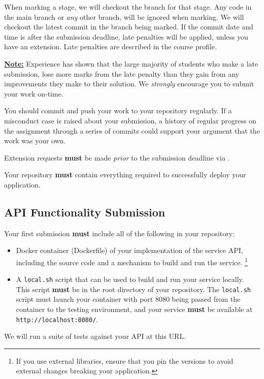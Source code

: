 \documentclass{csse4400}
\begin{document}
When marking a stage, we will checkout the branch for that stage.
Any code in the main branch or \textit{any} other branch, will be ignored when marking.
We will checkout the latest commit in the branch being marked.
If the commit date and time is after the submission deadline, late penalties will be applied,
unless you have an extension.
Late penalties are described in the course profile.

\textbf{\underline{Note:}} Experience has shown that the large majority of students who make a late submission,
lose more marks from the late penalty than they gain from any improvements they make to their solution.
We \textit{strongly} encourage you to submit your work on-time.

You should commit and push your work to your repository regularly.
If a misconduct case is raised about your submission,
a history of regular progress on the assignment through a series of commits
could support your argument that the work was your own.

Extension requests \textbf{must} be made \emph{prior} to the submission deadline via .

Your repository \textbf{must} contain everything required to successfully deploy your application.

\subsection{API Functionality Submission}
Your first submission \textbf{must} include all of the following in your repository:
\begin{itemize}
  \item Docker container (Dockerfile) of your implementation of the service API,
        including the source code and a mechanism to build and run the service.%
        \footnote{If you use external libraries,
                  ensure that you pin the versions to avoid external changes breaking your application.}
  \item A \texttt{local.sh} script that can be used to build and run your service locally.
        This script \textbf{must} be in the root directory of your repository.
        The \texttt{local.sh} script must launch your container with port 8080 being passed from the container
        to the testing environment, and your service \textbf{must} be available at \texttt{http://localhost:8080/}.
\end{itemize}
We will run a suite of tests against your API at this URL.
\end{document}
